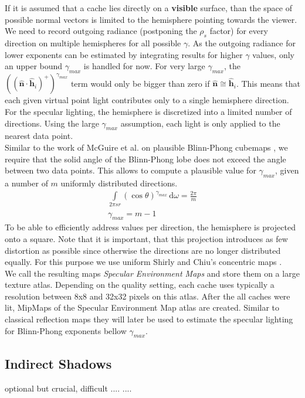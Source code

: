 \documentclass[thesis.tex]{subfiles}
\begin{document}
If it is assumed that a cache lies directly on a \textbf{visible} surface, than the space of possible normal vectors is limited to the hemisphere pointing towards the viewer.
We need to record outgoing radiance (postponing the $\rho_s$ factor) for every direction on multiple hemispheres for all possible $\gamma$.
As the outgoing radiance for lower exponents can be estimated by integrating results for higher $\gamma$ values, only an upper bound $\gamma_{max}$ is handled for now.
For very large $\gamma_{max}$, the $((\hat{\mathbf{n}} \cdot \hat{\mathbf{h}}_i)^+)^{\gamma_{max}}$ term would only be bigger than zero if $\hat{\mathbf{n}} \cong \hat{\mathbf{h}}_i$.
This means that each given virtual point light contributes only to a single hemisphere direction.
For the specular lighting, the hemisphere is discretized into a limited number of directions.
Using the large $\gamma_{max}$ assumption, each light is only applied to the nearest data point.\\
%
Similar to the work of McGuire et al. on plausible Blinn-Phong cubemaps \cite{bib:envmipmap}, we require that the solid angle of the Blinn-Phong lobe does not exceed the angle between two data points.
This allows to compute a plausible value for $\gamma_{max}$, given a number of $m$ uniformly distributed directions.
\begin{align}
\int\limits_{2\pi sr} (\cos\theta)^{\gamma_{max}}  \,\mathrm{d}\omega = \frac{2\pi}{m}\\
\gamma_{max} = m-1
\end{align}
%
To be able to efficiently address values per direction, the hemisphere is projected onto a square.
Note that it is important, that this projection introduces as few distortion as possible since otherwise the directions are no longer distributed equally.
For this purpose we use uniform Shirly and Chiu's concentric maps \cite{bib:concentricmaps}.\\ 
We call the resulting maps \emph{Specular Environment Maps} and store them on a large texture atlas.
Depending on the quality setting, each cache uses typically a resolution between 8x8 and 32x32 pixels on this atlas.
After the all caches were lit, MipMaps of the Specular Environment Map atlas are created.
Similar to classical reflection maps \cite[p.~308]{bib:RealtimeRenderingBook} they will later be used to estimate the specular lighting for Blinn-Phong exponents bellow $\gamma_{max}$.

\subsection{Indirect Shadows}
optional but crucial, difficult .... ....
\end{document}
